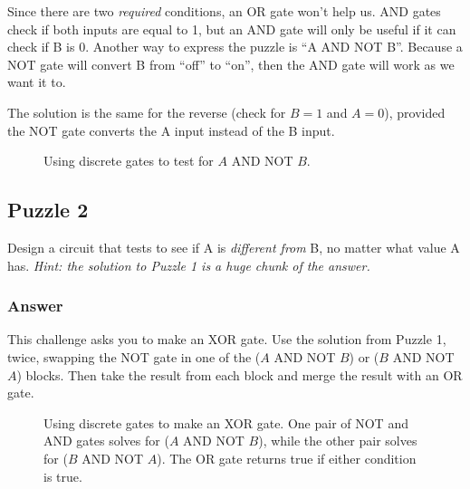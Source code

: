 Since there are two \emph{required} conditions, an OR gate won't help us. 
AND gates check if both inputs are equal to 1, but an AND gate will only be useful if it can check if B is 0. 
Another way to express the puzzle is ``A AND NOT B''. 
Because a NOT gate will convert B from ``off'' to ``on'', then the AND gate will work as we want it to.

The solution is the same for the reverse (check for $B=1$ and $A=0$), provided the NOT gate converts the A input instead of the B input.


\begin{figure}[hb!]
\begin{center}



\caption{Using discrete gates to test for $A$ AND NOT $B$.}

\end{center}
\end{figure}


\clearpage

\subsection*{Puzzle 2}

Design a circuit that tests to see if A is \emph{different from} B, no matter what value A has. \emph{Hint: the solution to Puzzle 1 is a huge chunk of the answer.}


\vfill

\subsubsection*{Answer}

This challenge asks you to make an XOR gate. Use the solution from Puzzle 1, twice, swapping the NOT gate in one of the ($A$ AND NOT $B$) or ($B$ AND NOT $A$) blocks. Then take the result from each block and merge the result with an OR gate.

\begin{figure}[hb!]
\begin{center}



\caption{Using discrete gates to make an XOR gate. One pair of NOT and AND gates solves for ($A$ AND NOT $B$), while the other pair solves for ($B$ AND NOT $A$). The OR gate returns true if either condition is true.}

\end{center}
\end{figure}

